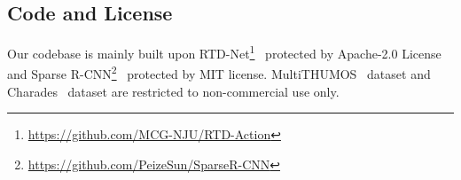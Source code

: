 \documentclass{article}
\begin{document}
\subsection{Code and License}
\label{sec:license}
Our codebase is mainly built upon RTD-Net\footnote[5]{\url{https://github.com/MCG-NJU/RTD-Action}}~\cite{DBLP:conf/iccv/TanT0W21} protected by Apache-2.0 License and Sparse R-CNN\footnote[6]{\url{https://github.com/PeizeSun/SparseR-CNN}}~\cite{DBLP:conf/cvpr/SunZJKXZTLYW021} protected by MIT license. MultiTHUMOS~\cite{DBLP:journals/ijcv/YeungRJAMF18} dataset and Charades~\cite{DBLP:conf/eccv/SigurdssonVWFLG16} dataset are restricted to non-commercial use only.
\end{document}
